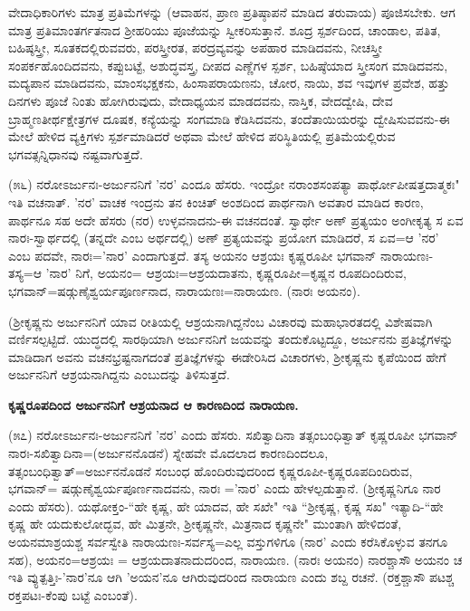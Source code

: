 
ವೇದಾಧಿಕಾರಿಗಳು ಮಾತ್ರ ಪ್ರತಿಮೆಗಳನ್ನು (ಆವಾಹನ, ಪ್ರಾಣ ಪ್ರತಿಷ್ಠಾಪನೆ ಮಾಡಿದ ತರುವಾಯ) ಪೂಜಿಸಬೇಕು. ಆಗ ಮಾತ್ರ ಪ್ರತಿಮಾಂತರ್ಗತನಾದ ಶ‍್ರೀಹರಿಯು ಪೂಜೆಯನ್ನು ಸ್ವೀಕರಿಸುತ್ತಾನೆ. ಶೂದ್ರ ಸ್ಪರ್ಶದಿಂದ, ಚಾಂಡಾಲ, ಪತಿತ, ಬಹಿಷ್ಠಸ್ತ್ರೀ, ಸೂತಕದಲ್ಲಿರುವವರು, ಪರಸ್ತ್ರೀರತ, ಪರದ್ರವ್ಯವನ್ನು ಅಪಹಾರ ಮಾಡಿದವನು, ನೀಚಸ್ತ್ರೀ ಸಂಪರ್ಕಹೊಂದಿದವನು, ಕಪ್ಪುಬಟ್ಟೆ, ಅಶುದ್ಧವಸ್ತ್ರ, ದೀಪದ ಎಣ್ಣೆಗಳ ಸ್ಪರ್ಶ, ಬಹಿಷ್ಠೆಯಾದ ಸ್ತ್ರೀಸಂಗ ಮಾಡಿದವನು, ಮದ್ಯಪಾನ ಮಾಡಿದವನು, ಮಾಂಸಭಕ್ಷಕನು, ಹಿಂಸಾಪರಾಯಣನು, ಚೋರ, ನಾಯಿ, ಶವ ಇವುಗಳ ಪ್ರವೇಶ, ಹತ್ತು ದಿನಗಳು ಪೂಜೆ ನಿಂತು ಹೋಗಿರುವುದು, ವೇದಾಧ್ಯಯನ ಮಾಡದವನು, ನಾಸ್ತಿಕ, ವೇದದ್ವೇಷಿ, ದೇವ ಬ್ರಾಹ್ಮಣತೀರ್ಥಕ್ಷೇತ್ರಗಳ ದೂಷಕ, ಕನ್ಯೆಯನ್ನು ಸಂಗಮಾಡಿ ಕೆಡಿಸಿದವನು, ತಂದೆತಾಯಿಯರನ್ನು ದ್ವೇಷಿಸುವವನು-ಈ ಮೇಲೆ ಹೇಳಿದ ವ್ಯಕ್ತಿಗಳು ಸ್ಪರ್ಶಮಾಡಿದರೆ ಅಥವಾ ಮೇಲೆ ಹೇಳಿದ ಪರಿಸ್ಥಿತಿಯಲ್ಲಿ ಪ್ರತಿಮೆಯಲ್ಲಿರುವ ಭಗವತ್ಸನ್ನಿಧಾನವು ನಷ್ಟವಾಗುತ್ತದೆ.

(೫೬) ನರೋಽರ್ಜುನಃ-ಅರ್ಜುನನಿಗೆ 'ನರ' ಎಂದೂ ಹೆಸರು. ಇಂದ್ರೋ ನರಾಂಶಸಂಪತ್ಯಾ ಪಾರ್ಥೋಪೀಷತ್ತದಾತ್ಮಕಃ" ಇತಿ ವಚನಾತ್. 'ನರ' ವಾಚಕ ಇಂದ್ರನು ತನ ಕಿಂಚಿತ್ ಅಂಶದಿಂದ ಪಾರ್ಥನಾಗಿ ಅವತಾರ ಮಾಡಿದ ಕಾರಣ, ಪಾರ್ಥನೂ ಸಹ ಅದೇ ಹೆಸರು (ನರ) ಉಳ್ಳವನಾದನು-ಈ ವಚನದಂತೆ. ಸ್ವಾರ್ಥೇ ಅಣ್ ಪ್ರತ್ಯಯಂ ಅಂಗೀಕೃತ್ಯ ಸ ಏವ ನಾರಃ-ಸ್ವಾರ್ಥದಲ್ಲಿ (ತನ್ನದೇ ಎಂಬ ಅರ್ಥದಲ್ಲಿ) ಅಣ್ ಪ್ರತ್ಯಯವನ್ನು ಪ್ರಯೋಗ ಮಾಡಿದರೆ, ಸ ಏವ=ಆ 'ನರ' ಎಂಬ ಪದವೇ, ನಾರಃ='ನಾರ' ಎಂದಾಗುತ್ತದೆ. ತಸ್ಯ ಅಯನಂ ಆಶ್ರಯಃ ಕೃಷ್ಣರೂಪೀ ಭಗವಾನ್ ನಾರಾಯಣಃ-ತಸ್ಯ=ಆ 'ನಾರ' ನಿಗೆ, ಅಯನಂ= ಆಶ್ರಯಃ=ಆಶ್ರಯದಾತನು, ಕೃಷ್ಣರೂಪೀ=ಕೃಷ್ಣನ ರೂಪದಿಂದಿರುವ, ಭಗವಾನ್=ಷಡ್ಗುಣೈಶ್ವರ್ಯಪೂರ್ಣನಾದ, ನಾರಾಯಣಃ=ನಾರಾಯಣ. (ನಾರಃ ಅಯನಂ).

(ಶ‍್ರೀಕೃಷ್ಣನು ಅರ್ಜುನನಿಗೆ ಯಾವ ರೀತಿಯಲ್ಲಿ ಆಶ್ರಯನಾಗಿದ್ದನೆಂಬ ವಿಚಾರವು ಮಹಾಭಾರತದಲ್ಲಿ ವಿಶೇಷವಾಗಿ ವರ್ಣಿಸಲ್ಪಟ್ಟಿದೆ. ಯುದ್ಧದಲ್ಲಿ ಸಾರಥಿಯಾಗಿ ಅರ್ಜುನನಿಗೆ ಜಯವನ್ನು ತಂದುಕೊಟ್ಟದ್ದೂ, ಅರ್ಜುನನು ಪ್ರತಿಜ್ಞೆಗಳನ್ನು ಮಾಡಿದಾಗ ಅವನು ವಚನಭ್ರಷ್ಟನಾಗದಂತೆ ಪ್ರತಿಜ್ಞೆಗಳನ್ನು ಈಡೇರಿಸಿದ ವಿಚಾರಗಳು, ಶ‍್ರೀಕೃಷ್ಣನು ಕೃಪೆಯಿಂದ ಹೇಗೆ ಅರ್ಜುನನಿಗೆ ಆಶ್ರಯನಾಗಿದ್ದನು ಎಂಬುದನ್ನು ತಿಳಿಸುತ್ತದೆ.

\begin{center}
\textbf{ಕೃಷ್ಣರೂಪದಿಂದ ಅರ್ಜುನನಿಗೆ ಆಶ್ರಯನಾದ ಆ ಕಾರಣದಿಂದ ನಾರಾಯಣ.}
\end{center}

(೫೭) ನರೋಽರ್ಜುನಃ-ಅರ್ಜುನನಿಗೆ 'ನರ' ಎಂದು ಹೆಸರು. ಸಖಿತ್ವಾದಿನಾ ತತ್ಸಂಬಂಧಿತ್ವಾತ್ ಕೃಷ್ಣರೂಪೀ ಭಗವಾನ್ ನಾರಃ-ಸಖಿತ್ವಾದಿನಾ=(ಅರ್ಜುನನೊಡನೆ) ಸ್ನೇಹವೇ ಮೊದಲಾದ ಕಾರಣದಿಂದಲೂ, ತತ್ಸಂಬಂಧಿತ್ವಾತ್=ಅರ್ಜುನನೊಡನೆ ಸಂಬಂಧ ಹೊಂದಿರುವುದರಿಂದ ಕೃಷ್ಣರೂಪೀ-ಕೃಷ್ಣರೂಪದಿಂದಿರುವ, ಭಗವಾನ್= ಷಡ್ಗುಣೈಶ್ವರ್ಯಪೂರ್ಣನಾದವನು, ನಾರಃ ='ನಾರ' ಎಂದು ಹೇಳಲ್ಪಡುತ್ತಾನೆ. (ಶ‍್ರೀಕೃಷ್ಣನಿಗೂ ನಾರ ಎಂದು ಹೆಸರು). ಯಥೋಕ್ತಂ-``ಹೇ ಕೃಷ್ಣ, ಹೇ ಯಾದವ, ಹೇ ಸಖೇ" ಇತಿ ``ಶ‍್ರೀಕೃಷ್ಣ, ಕೃಷ್ಣ ಸಖ" ಇತ್ಯಾದಿ-``ಹೇ ಕೃಷ್ಣ ಹೇ ಯದುಕುಲೋದ್ಭವ, ಹೇ ಮಿತ್ರನೇ, ಶ‍್ರೀಕೃಷ್ಣನೇ, ಮಿತ್ರನಾದ ಕೃಷ್ಣನೇ" ಮುಂತಾಗಿ ಹೇಳಿದಂತೆ, ಅಯನಮಾಶ್ರಯಶ್ಚ ಸರ್ವಸ್ವೇತಿ ನಾರಾಯಣಃ-ಸರ್ವಸ್ಯ=ಎಲ್ಲ ವಸ್ತುಗಳಿಗೂ (ನಾರ' ಎಂದು ಕರೆಸಿಕೊಳ್ಳುವ ತನಗೂ ಸಹ), ಅಯನಂ=ಆಶ್ರಯಃ = ಆಶ್ರಯದಾತನಾದುದರಿಂದ, ನಾರಾಯಣ. (ನಾರಃ ಅಯನಂ) ನಾರಶ್ಚಾಸೌ ಅಯನಂ ಚ ಇತಿ ವ್ಯುತ್ಪತ್ತಿಃ-'ನಾರ'ನೂ ಆಗಿ 'ಅಯನ'ನೂ ಆಗಿರುವುದರಿಂದ ನಾರಾಯಣ ಎಂದು ಶಬ್ದ ರಚನೆ. (ರಕ್ತಶ್ಚಾಸೌ ಪಟಶ್ಚ ರಕ್ತಪಟಃ-ಕೆಂಪು ಬಟ್ಟೆ ಎಂಬಂತೆ).

